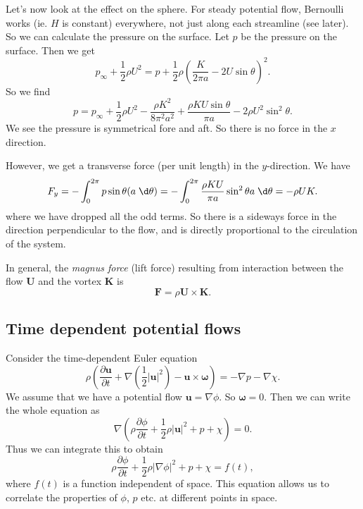 \documentclass[a4paper]{article}
\begin{document}
\begin{eg}
\begin{center}
  \end{center}
  Let's now look at the effect on the sphere. For steady potential flow, Bernoulli works (ie. $H$ is constant) everywhere, not just along each streamline (see later). So we can calculate the pressure on the surface. Let $p$ be the pressure on the surface. Then we get
  \[
    p_\infty + \frac{1}{2} \rho U^2 = p + \frac{1}{2} \rho \left(\frac{K}{2\pi a} - 2U \sin \theta\right)^2.
  \]
  So we find
  \[
    p = p_\infty + \frac{1}{2} \rho U^2 - \frac{\rho K^2}{8 \pi^2 a^2} + \frac{\rho KU \sin \theta}{\pi a} - 2\rho U^2 \sin^2 \theta.
  \]
  We see the pressure is symmetrical fore and aft. So there is no force in the $x$ direction.

  However, we get a transverse force (per unit length) in the $y$-direction. We have
  \[
    F_y = -\int_0^{2\pi} p \sin \theta (a \;\d \theta) = -\int_0^{2\pi} \frac{\rho K U}{\pi a} \sin^2 \theta a \;\d \theta = - \rho UK.
  \]
  where we have dropped all the odd terms. So there is a sideways force in the direction perpendicular to the flow, and is directly proportional to the circulation of the system.

  In general, the \emph{magnus force} (lift force) resulting from interaction between the flow $\mathbf{U}$ and the vortex $\mathbf{K}$ is
  \[
    \mathbf{F} = \rho \mathbf{U}\times \mathbf{K}.
  \]
\end{eg}
\subsection{Time dependent potential flows}
Consider the time-dependent Euler equation
\[
  \rho\left(\frac{\partial \mathbf{u}}{\partial t} + \nabla\left(\frac{1}{2}|\mathbf{u}|^2\right) - \mathbf{u}\times \boldsymbol\omega\right) = -\nabla p - \nabla \chi.
\]
We assume that we have a potential flow $\mathbf{u} = \nabla \phi$. So $\boldsymbol\omega = 0$. Then we can write the whole equation as
\[
  \nabla \left(\rho \frac{\partial \phi}{\partial t} + \frac{1}{2} \rho |\mathbf{u}|^2 + p + \chi\right) = 0.
\]
Thus we can integrate this to obtain
\[
  \rho \frac{\partial\phi}{\partial t} + \frac{1}{2} \rho |\nabla \phi|^2 + p + \chi = f(t),
\]
where $f(t)$ is a function independent of space. This equation allows us to correlate the properties of $\phi$, $p$ etc. at different points in space.
\end{document}
